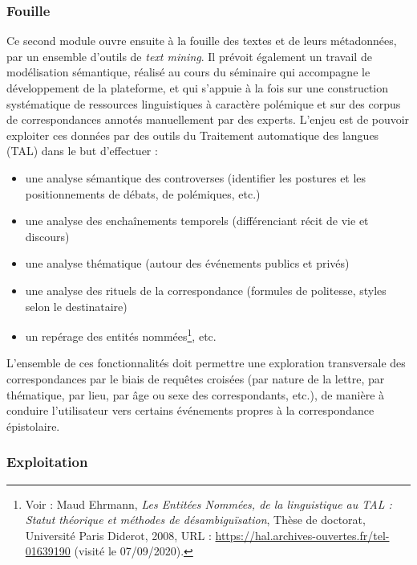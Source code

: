 \subsubsection{Fouille}

Ce second module ouvre ensuite à la fouille des textes et de leurs métadonnées, par un ensemble d’outils de \emph{text mining}. Il prévoit également un travail de modélisation sémantique, réalisé au cours du séminaire qui accompagne le développement de la plateforme, et qui s’appuie à la fois sur une construction systématique de ressources linguistiques à caractère polémique et sur des corpus de correspondances annotés manuellement par des experts. L’enjeu est de pouvoir exploiter ces données par des outils du Traitement automatique des langues (TAL) dans le but d’effectuer :
\begin{itemize}
    \item une analyse sémantique des controverses (identifier les postures et les positionnements de débats, de polémiques, etc.) 
    \item une analyse des enchaînements temporels (différenciant récit de vie et discours)
    \item une analyse thématique (autour des événements publics et privés)
    \item une analyse des rituels de la correspondance (formules de politesse, styles selon le destinataire) 
    \item un repérage des entités nommées\footnote{ Voir : Maud Ehrmann, \emph{Les Entitées Nommées, de la linguistique au TAL : Statut théorique et méthodes
de désambiguïsation}, Thèse de doctorat, Université Paris Diderot, 2008, URL : \url{https://hal.archives-ouvertes.fr/tel-01639190} (visité le 07/09/2020).}, etc.
\end{itemize}

L’ensemble de ces fonctionnalités doit permettre une exploration transversale des correspondances par le biais de requêtes croisées (par nature de la lettre, par thématique, par lieu, par âge ou sexe des correspondants, etc.), de manière à conduire l’utilisateur vers certains événements propres à la correspondance épistolaire.

\subsubsection{Exploitation}


